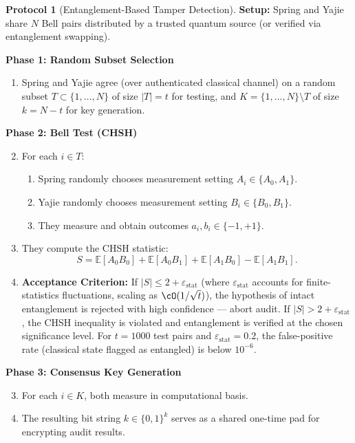 \documentclass[11pt,a4paper]{article}
\theoremstyle{plain}
\theoremstyle{definition}
\newtheorem{protocol}[theorem]{Protocol}
\theoremstyle{remark}
\newcommand{\E}{\mathbb{E}}
\begin{document}
\begin{protocol}[Entanglement-Based Tamper Detection]\label{prot:ent_tamper}
\textbf{Setup:} Spring and Yajie share $N$ Bell pairs distributed by a
trusted quantum source (or verified via entanglement swapping).

\medskip
\noindent\textbf{Phase 1: Random Subset Selection}

\begin{enumerate}[label=1.\arabic*]
  \item Spring and Yajie agree (over authenticated classical channel) on
        a random subset $T \subset \{1,\ldots,N\}$ of size $|T| = t$
        for testing, and $K = \{1,\ldots,N\} \setminus T$ of size $k = N-t$
        for key generation.
\end{enumerate}

\medskip
\noindent\textbf{Phase 2: Bell Test (CHSH)}

\begin{enumerate}[label=2.\arabic*]
  \setcounter{enumi}{1}
  \item For each $i \in T$:
  \begin{enumerate}
    \item Spring randomly chooses measurement setting
          $A_i \in \{A_0, A_1\}$.
    \item Yajie randomly chooses measurement setting
          $B_i \in \{B_0, B_1\}$.
    \item They measure and obtain outcomes $a_i, b_i \in \{-1, +1\}$.
  \end{enumerate}
  \item They compute the CHSH statistic:
        \[
        S = \E[A_0 B_0] + \E[A_0 B_1] + \E[A_1 B_0] - \E[A_1 B_1].
        \]
  \item \textbf{Acceptance Criterion:} If $|S| \leq 2 + \varepsilon_{\text{stat}}$
        (where $\varepsilon_{\text{stat}}$ accounts for finite-statistics
        fluctuations, scaling as $\cO(1/\sqrt{t})$), the hypothesis of
        intact entanglement is rejected with high confidence — abort audit.
        If $|S| > 2 + \varepsilon_{\text{stat}}$, the CHSH inequality is
        violated and entanglement is verified at the chosen significance
        level. For $t = 1000$ test pairs and $\varepsilon_{\text{stat}} = 0.2$,
        the false-positive rate (classical state flagged as entangled) is
        below $10^{-6}$.
\end{enumerate}

\medskip
\noindent\textbf{Phase 3: Consensus Key Generation}

\begin{enumerate}[label=3.\arabic*]
  \setcounter{enumi}{2}
  \item For each $i \in K$, both measure in computational basis.
  \item The resulting bit string $k \in \{0,1\}^{k}$ serves as a shared
        one-time pad for encrypting audit results.
\end{enumerate}
\end{protocol}
\end{document}
